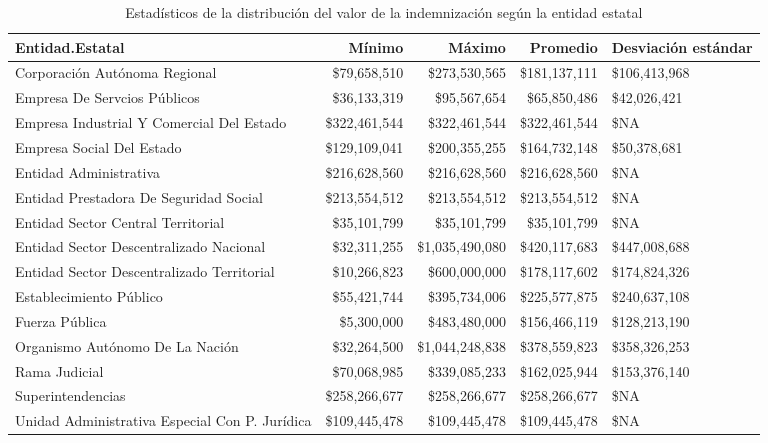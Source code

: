 \begin{table}[htbp]
\centering
\caption{Estadísticos de la distribución del
valor de la indemnización según la entidad estatal} 
\label{tab:indemnizacion-entidad}
\begin{tabular}{lrrrR{2cm}}
  \hline
Entidad.Estatal & Mínimo & Máximo & Promedio & Desviación estándar \\ 
  \hline
Corporación Autónoma Regional & \$79,658,510 & \$273,530,565 & \$181,137,111 & \$106,413,968 \\ 
  Empresa De Servcios Públicos & \$36,133,319 & \$95,567,654 & \$65,850,486 & \$42,026,421 \\ 
  Empresa Industrial Y Comercial Del Estado & \$322,461,544 & \$322,461,544 & \$322,461,544 & \$NA \\ 
  Empresa Social Del Estado & \$129,109,041 & \$200,355,255 & \$164,732,148 & \$50,378,681 \\ 
  Entidad Administrativa & \$216,628,560 & \$216,628,560 & \$216,628,560 & \$NA \\ 
  Entidad Prestadora De Seguridad Social & \$213,554,512 & \$213,554,512 & \$213,554,512 & \$NA \\ 
  Entidad Sector Central Territorial & \$35,101,799 & \$35,101,799 & \$35,101,799 & \$NA \\ 
  Entidad Sector Descentralizado Nacional & \$32,311,255 & \$1,035,490,080 & \$420,117,683 & \$447,008,688 \\ 
  Entidad Sector Descentralizado Territorial & \$10,266,823 & \$600,000,000 & \$178,117,602 & \$174,824,326 \\ 
  Establecimiento Público & \$55,421,744 & \$395,734,006 & \$225,577,875 & \$240,637,108 \\ 
  Fuerza Pública & \$5,300,000 & \$483,480,000 & \$156,466,119 & \$128,213,190 \\ 
  Organismo Autónomo De La Nación & \$32,264,500 & \$1,044,248,838 & \$378,559,823 & \$358,326,253 \\ 
  Rama Judicial & \$70,068,985 & \$339,085,233 & \$162,025,944 & \$153,376,140 \\ 
  Superintendencias & \$258,266,677 & \$258,266,677 & \$258,266,677 & \$NA \\ 
  Unidad Administrativa Especial Con P. Jurídica & \$109,445,478 & \$109,445,478 & \$109,445,478 & \$NA \\ 
   \hline
\end{tabular}
\end{table}
